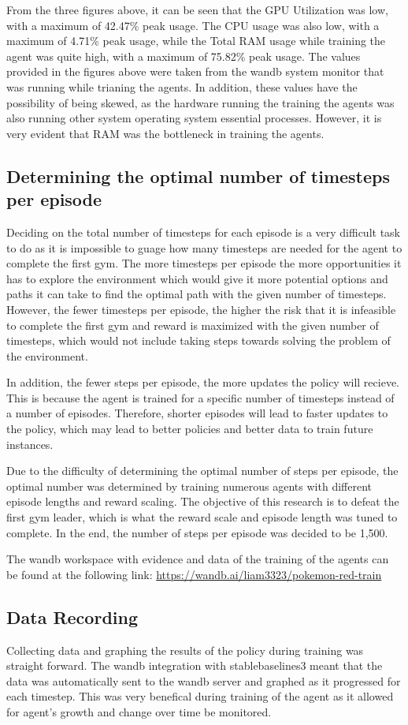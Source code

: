 From the three figures above, it can be seen that the GPU Utilization was low, with a maximum of 42.47\% peak usage. The CPU usage was also low, with a maximum of 4.71\% peak usage, while the Total RAM usage while training the agent was quite high, with a maximum of 75.82\% peak usage. The values provided in the figures above were taken from the wandb system monitor that was running while trianing the agents. In addition, these values have the possibility of being skewed, as the hardware running the training the agents was also running other system operating system essential processes. However, it is very evident that RAM was the bottleneck in training the agents.  

\subsection{Determining the optimal number of timesteps per episode}

Deciding on the total number of timesteps for each episode is a very difficult task to do as it is impossible to guage how many timesteps are needed for the agent to complete the first gym. The more timesteps per episode the more opportunities it has to explore the environment which would give it more potential options and paths it can take to find the optimal path with the given number of timesteps. However, the fewer timesteps per episode, the higher the risk that it is infeasible to complete the first gym and reward is maximized with the given number of timesteps, which would not include taking steps towards solving the problem of the environment. 

In addition, the fewer steps per episode, the more updates the policy will recieve. This is because the agent is trained for a specific number of timesteps instead of a number of episodes. Therefore, shorter episodes will lead to faster updates to the policy, which may lead to better policies and better data to train future instances. 

Due to the difficulty of determining the optimal number of steps per episode, the optimal number was determined by training numerous agents with different episode lengths and reward scaling. The objective of this research is to defeat the first gym leader, which is what the reward scale and episode length was tuned to complete. In the end, the number of steps per episode was decided to be 1,500. 

The wandb workspace with evidence and data of the training of the agents can be found at the following link: \url{https://wandb.ai/liam3323/pokemon-red-train}

\subsection{Data Recording}

Collecting data and graphing the results of the policy during training was straight forward. The wandb integration with stablebaselines3 meant that the data was automatically sent to the wandb server and graphed as it progressed for each timestep. This was very benefical during training of the agent as it allowed for agent's growth and change over time be monitored.  
